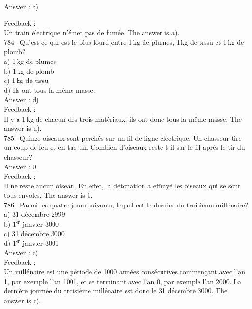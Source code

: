 \documentclass[letterpaper, 12pt]{article}
\begin{document}
Answer : a)

Feedback : \\
Un train \'electrique n'\'emet pas de fum\'ee. The answer is a).\\

784-- Qu'est-ce qui est le plus lourd entre 1\,kg de plumes, 1\,kg de tissu
et 1\,kg de plomb?\\
a) 1\,kg de plumes\\
b) 1\,kg de plomb\\
c) 1\,kg de tissu\\
d) Ils ont tous la m\^eme masse.\\

Answer : d)\\

Feedback : \\
Il y a 1\,kg de chacun des trois mat\'eriaux, ils ont donc tous la m\^eme
masse.  The answer is d).\\

785-- Quinze oiseaux sont perch\'es sur un fil de ligne \'electrique.  Un
chasseur tire un coup de feu et en tue un.  Combien d'oiseaux reste-t-il sur
le fil apr\`es le tir du chasseur?\\

Answer : 0\\

Feedback : \\
Il ne reste aucun oiseau. En effet, la d\'etonation a effray\'e les oiseaux
qui se sont tous envol\'es. The answer is 0. \\

786-- Parmi les quatre jours suivants, lequel est le dernier du troisi\`eme
mill\'enaire?\\
a) 31 d\'ecembre 2999\\
b) $1^{\textrm{er}}$ janvier 3000\\
c) 31 d\'ecembre 3000\\
d) $1^{\textrm{er}}$ janvier 3001\\

Answer : c)\\

Feedback : \\
Un mill\'enaire est une p\'eriode de 1000 ann\'ees cons\'ecutives commen\c
cant avec l'an 1, par exemple l'an 1001, et se terminant avec l'an 0, par
exemple l'an 2000.  La derni\`ere journ\'ee du troisi\`eme mill\'enaire est
donc le 31 d\'ecembre 3000.  The answer is c).\\
\end{document}
